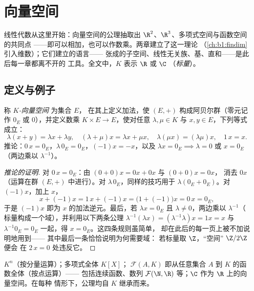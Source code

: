 \chapter{向量空间}\label{ch:b1:vspaces}

线性代数从这里开始：向量空间的公理抽取出
$\R^2$、$\R^3$、多项式空间与函数空间的共同点
——即可以相加，也可以作数乘。两章建立了这一理论
（\cref{ch:b1:findim} 引入维数）；它们建立的语言——
张成的子空间、线性无关族、基、直和——是此后每一章都离不开的
工具。全文中，$K$ 表示 $\R$ 或 $\C$
（\emph{标量}）。

\section{定义与例子}

\begin{definition}[向量空间]\label{def:b1:vspaces:def}
称 \emph{$K$-向量空间} 为集合 $E$，
在其上定义加法，使 $(E, +)$ 构成阿贝尔群（零元记作 $0_E$ 或
$0$），并定义数乘 $K \times E \to E$，使对任意
$\lambda, \mu \in K$ 与 $x, y \in E$，下列等式成立：
\[
\lambda(x + y) = \lambda x + \lambda y,\quad
(\lambda + \mu) x = \lambda x + \mu x,\quad
\lambda(\mu x) = (\lambda\mu) x,\quad
1\,x = x .
\]
推论：$0\,x = 0_E$，$\lambda\,0_E = 0_E$，$(-1)x = -x$，以及
$\lambda x = 0_E \implies \lambda = 0$ 或 $x = 0_E$（两边乘以
$\lambda^{-1}$）。
\end{definition}

\begin{proof}[推论的证明]
对 $0\,x = 0_E$：由 $(0 + 0)x = 0x + 0x$ 与 $(0+0)x = 0x$，
消去 $0x$（运算在群 $(E, +)$ 中进行）。对 $\lambda\,0_E$，同样的技巧用于
$\lambda(0_E + 0_E)$。对 $(-1)x$，加上 $x$，
\[
x + (-1)x = 1\,x + (-1)x = \bigl(1 + (-1)\bigr)x = 0\,x = 0_E ,
\]
于是 $(-1)x$ 即为 $x$ 的加法逆元。最后，若 $\lambda x
= 0_E$ 且 $\lambda \neq 0$，两边乘以 $\lambda^{-1}$（
标量构成一个域），并利用以下两条公理
$\lambda^{-1}(\lambda x) = (\lambda^{-1}\lambda)x = 1x = x$
与 $\lambda^{-1}0_E = 0_E$ 一起，得 $x = 0_E$。这四条规则虽简单，
却在此后的每一页上被不加说明地用到——
其中最后一条恰恰说明为何需要域：
若标量取 $\Z$，“空间” $\Z/2\Z$ 便会
在 $2\,x = 0$ 处违反它。
\end{proof}

\begin{example}\label{ex:b1:vspaces:examples}
$K^n$（按分量运算）；多项式全体 $K[X]$；
$\mathcal{F}(A, K)$ 即从任意集合 $A$ 到 $K$ 的函数全体（按点运算）——
包括连续函数、数列
$\mathcal{F}(\N, \R)$ 等；$\C$ 作为 $\R$ 上的向量空间。在每种
情形下，公理均自 $K$ 继承而来。
\end{example}

